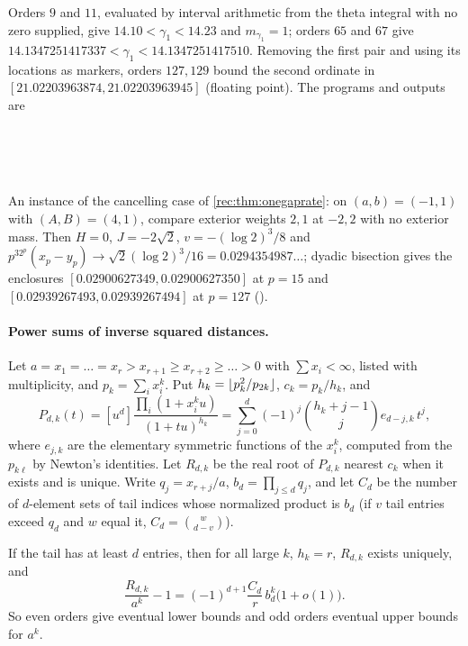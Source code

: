 \begin{example}\label{rec:ex:onegap}
Orders $9$ and $11$, evaluated by interval arithmetic from the theta integral with no zero
supplied, give $14.10<\gamma_1<14.23$ and $m_{\gamma_1}=1$; orders $65$ and $67$ give
$14.1347251417337<\gamma_1<14.1347251417510$. Removing the first pair and using its locations as
markers, orders $127,129$ bound the second ordinate in $[21.02203963874,21.02203963945]$
(floating point). The programs and outputs are
\begin{center}
\\
\\
\\
\end{center}
An instance of the cancelling case of
\cref{rec:thm:onegaprate}: on $(a,b)=(-1,1)$ with $(A,B)=(4,1)$, compare exterior weights $2,1$
at $-2,2$ with no exterior mass. Then $H=0$, $J=-2\sqrt2$, $v=-(\log2)^3/8$ and
$p^32^p(x_p-y_p)\to\sqrt2(\log2)^3/16=0.0294354987\ldots$; dyadic bisection gives the enclosures
$[0.02900627349,0.02900627350]$ at $p=15$ and $[0.02939267493,0.02939267494]$ at $p=127$
().
\end{example}

\paragraph{Power sums of inverse squared distances.}
Let $a=x_1=\dots=x_r>x_{r+1}\ge x_{r+2}\ge\dots>0$ with $\sum x_i<\infty$, listed with
multiplicity, and $p_k=\sum_ix_i^k$. Put $h_k=\lfloor p_k^2/p_{2k}\rfloor$, $c_k=p_k/h_k$, and
\[
 P_{d,k}(t)=[u^d]\frac{\prod_i(1+x_i^ku)}{(1+tu)^{h_k}}
 =\sum_{j=0}^d(-1)^j\binom{h_k+j-1}je_{d-j,k}\,t^j,
\]
where $e_{j,k}$ are the elementary symmetric functions of the $x_i^k$, computed from the $p_{k\ell}$
by Newton's identities. Let $R_{d,k}$ be the real root of $P_{d,k}$ nearest $c_k$ when it exists
and is unique. Write $q_j=x_{r+j}/a$, $b_d=\prod_{j\le d}q_j$, and let $C_d$ be the number of
$d$-element sets of tail indices whose normalized product is $b_d$ (if $v$ tail entries exceed
$q_d$ and $w$ equal it, $C_d=\binom w{d-v}$).

\begin{theorem}\label{rec:thm:alternating}
If the tail has at least $d$ entries, then for all large $k$, $h_k=r$, $R_{d,k}$ exists uniquely,
and
\[
 \frac{R_{d,k}}{a^k}-1=(-1)^{d+1}\frac{C_d}r\,b_d^k\bigl(1+o(1)\bigr).
\]
So even orders give eventual lower bounds and odd orders eventual upper bounds for $a^k$.
\end{theorem}

